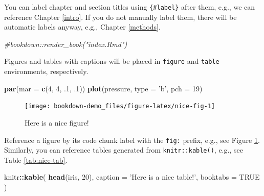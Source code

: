 \documentclass[]{book}
\newenvironment{Shaded}{\begin{snugshade}}{\end{snugshade}}
\newcommand{\CommentTok}[1]{\textcolor[rgb]{0.56,0.35,0.01}{\textit{#1}}}
\newcommand{\DataTypeTok}[1]{\textcolor[rgb]{0.13,0.29,0.53}{#1}}
\newcommand{\DecValTok}[1]{\textcolor[rgb]{0.00,0.00,0.81}{#1}}
\newcommand{\FloatTok}[1]{\textcolor[rgb]{0.00,0.00,0.81}{#1}}
\newcommand{\KeywordTok}[1]{\textcolor[rgb]{0.13,0.29,0.53}{\textbf{#1}}}
\newcommand{\NormalTok}[1]{#1}
\newcommand{\OperatorTok}[1]{\textcolor[rgb]{0.81,0.36,0.00}{\textbf{#1}}}
\newcommand{\OtherTok}[1]{\textcolor[rgb]{0.56,0.35,0.01}{#1}}
\newcommand{\StringTok}[1]{\textcolor[rgb]{0.31,0.60,0.02}{#1}}
\begin{document}
You can label chapter and section titles using \texttt{\{\#label\}} after them, e.g., we can reference Chapter \ref{intro}. If you do not manually label them, there will be automatic labels anyway, e.g., Chapter \ref{methods}.

\begin{Shaded}
\begin{Highlighting}[]
\CommentTok{#bookdown::render_book("index.Rmd")}
\end{Highlighting}
\end{Shaded}

Figures and tables with captions will be placed in \texttt{figure} and \texttt{table} environments, respectively.

\begin{Shaded}
\begin{Highlighting}[]
\KeywordTok{par}\NormalTok{(}\DataTypeTok{mar =} \KeywordTok{c}\NormalTok{(}\DecValTok{4}\NormalTok{, }\DecValTok{4}\NormalTok{, }\FloatTok{.1}\NormalTok{, }\FloatTok{.1}\NormalTok{))}
\KeywordTok{plot}\NormalTok{(pressure, }\DataTypeTok{type =} \StringTok{'b'}\NormalTok{, }\DataTypeTok{pch =} \DecValTok{19}\NormalTok{)}
\end{Highlighting}
\end{Shaded}

\begin{figure}

{\centering \texttt{[image: bookdown-demo\_files/figure-latex/nice-fig-1]} 

}

\caption{Here is a nice figure!}\label{fig:nice-fig}
\end{figure}

Reference a figure by its code chunk label with the \texttt{fig:} prefix, e.g., see Figure \ref{fig:nice-fig}. Similarly, you can reference tables generated from \texttt{knitr::kable()}, e.g., see Table \ref{tab:nice-tab}.

\begin{Shaded}
\begin{Highlighting}[]
\NormalTok{knitr}\OperatorTok{::}\KeywordTok{kable}\NormalTok{(}
  \KeywordTok{head}\NormalTok{(iris, }\DecValTok{20}\NormalTok{), }\DataTypeTok{caption =} \StringTok{'Here is a nice table!'}\NormalTok{,}
  \DataTypeTok{booktabs =} \OtherTok{TRUE}
\NormalTok{)}
\end{Highlighting}
\end{Shaded}
\end{document}
